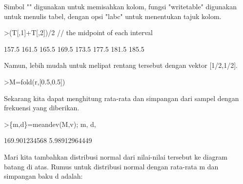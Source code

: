 \documentclass{article}
\newenvironment{eulernotebook}{\par}{\par}
\newenvironment{eulercomment}{\par\medskip}{\par\medskip}
\begin{document}
\begin{eulernotebook}
\begin{eulercomment}
Simbol "\textbar{}" digunakan untuk memisahkan kolom, fungsi "writetable"
digunakan untuk menulis tabel, dengan opsi "labc" untuk menentukan
tajuk kolom.
\end{eulercomment}
\begin{eulerprompt}
>(T[,1]+T[,2])/2 // the midpoint of each interval
\end{eulerprompt}
\begin{euleroutput}
          157.5 
          161.5 
          165.5 
          169.5 
          173.5 
          177.5 
          181.5 
          185.5 
\end{euleroutput}
\begin{eulercomment}
Namun, lebih mudah untuk melipat rentang tersebut dengan vektor
[1/2,1/2].
\end{eulercomment}
\begin{eulerprompt}
>M=fold(r,[0.5,0.5])
\end{eulerprompt}
\begin{euleroutput}
  [157.5,  161.5,  165.5,  169.5,  173.5,  177.5,  181.5,  185.5]
\end{euleroutput}
\begin{eulercomment}
Sekarang kita dapat menghitung rata-rata dan simpangan dari sampel
dengan frekuensi yang diberikan.
\end{eulercomment}
\begin{eulerprompt}
>\{m,d\}=meandev(M,v); m, d,
\end{eulerprompt}
\begin{euleroutput}
  169.901234568
  5.98912964449
\end{euleroutput}
\begin{eulercomment}
Mari kita tambahkan distribusi normal dari nilai-nilai tersebut ke
diagram batang di atas. Rumus untuk distribusi normal dengan rata-rata
\textdollar{}m\textdollar{} dan simpangan baku \textdollar{}d\textdollar{} adalah:


\end{eulercomment}
\end{eulernotebook}
\end{document}
